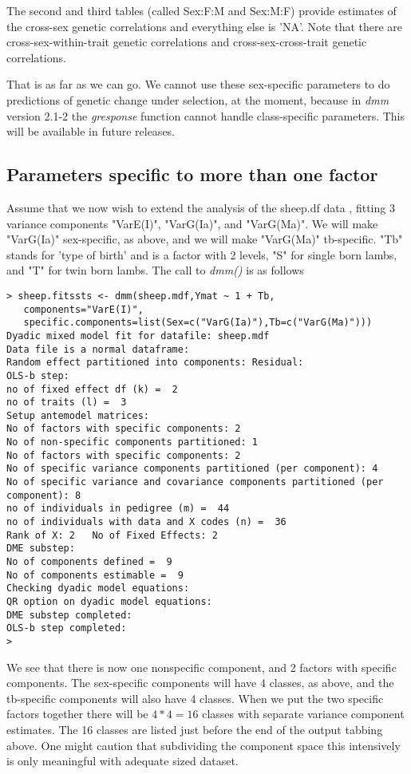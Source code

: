 \documentclass[titlepage]{article}  %
\begin{document}
The second and third tables (called Sex:F:M and Sex:M:F) provide estimates of the cross-sex genetic correlations and everything else is 'NA'. Note that there are cross-sex-within-trait genetic correlations and cross-sex-cross-trait genetic correlations.

That is as far as we can go. We cannot use these sex-specific parameters to do predictions of genetic change under selection, at the moment, because in {\em dmm} version 2.1-2 the {\em gresponse} function cannot handle class-specific parameters. This will be available in future releases.

\subsection{Parameters specific to more than one factor}

Assume that we now wish to extend the analysis of the sheep.df data , fitting 3 variance components "VarE(I)", "VarG(Ia)", and "VarG(Ma)". We will make "VarG(Ia)" sex-specific, as above, and we will make "VarG(Ma)" tb-specific. "Tb" stands for 'type of birth' and is a factor with 2 levels, "S" for single born lambs, and "T" for twin born lambs. The call to {\em dmm()} is as follows

\begin{verbatim}
> sheep.fitssts <- dmm(sheep.mdf,Ymat ~ 1 + Tb,
   components="VarE(I)",
   specific.components=list(Sex=c("VarG(Ia)"),Tb=c("VarG(Ma)")))
Dyadic mixed model fit for datafile: sheep.mdf  
Data file is a normal dataframe:
Random effect partitioned into components: Residual:
OLS-b step:
no of fixed effect df (k) =  2 
no of traits (l) =  3 
Setup antemodel matrices:
No of factors with specific components: 2 
No of non-specific components partitioned: 1 
No of factors with specific components: 2 
No of specific variance components partitioned (per component): 4 
No of specific variance and covariance components partitioned (per component): 8 
no of individuals in pedigree (m) =  44 
no of individuals with data and X codes (n) =  36 
Rank of X: 2   No of Fixed Effects: 2 
DME substep:
No of components defined =  9 
No of components estimable =  9 
Checking dyadic model equations:
QR option on dyadic model equations:
DME substep completed:
OLS-b step completed:
> 
\end{verbatim}
We see that there is now one nonspecific component, and 2 factors with specific components. The sex-specific components will have 4 classes, as above, and the tb-specific components will also have 4 classes. When we put the two specific factors together there will be $4 * 4 = 16$ classes with separate variance component estimates. The 16 classes are listed just before the end of the output tabbing above. One might caution that subdividing the component space this intensively is only meaningful with adequate sized dataset.
\end{document}
